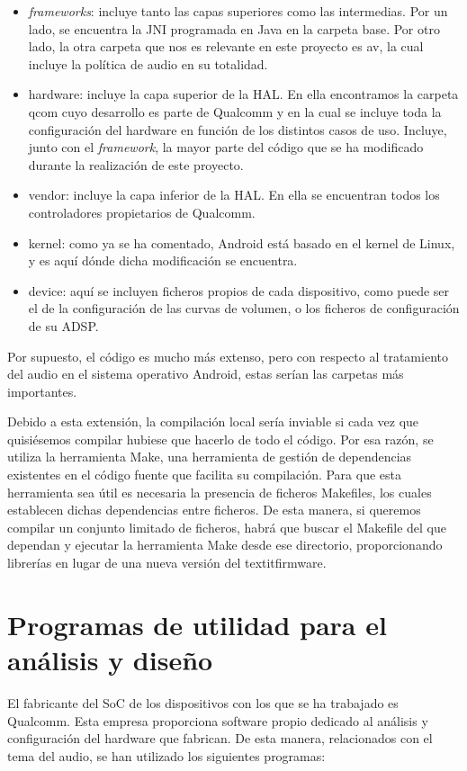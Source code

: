 \begin{itemize}
	\item{\textit{frameworks}: incluye tanto las capas superiores como las intermedias. Por un lado, se encuentra la \gls{JNI} programada en Java en la carpeta base. Por otro lado, la otra carpeta que nos es relevante en este proyecto es av, la cual incluye la política de audio en su totalidad.}
	\item{hardware: incluye la capa superior de la \gls{HAL}. En ella encontramos la carpeta qcom cuyo desarrollo es parte de Qualcomm y en la cual se incluye toda la configuración del hardware en función de los distintos casos de uso. Incluye, junto con el \textit{framework}, la mayor parte del código que se ha modificado durante la realización de este proyecto.}
	\item{vendor: incluye la capa inferior de la \gls{HAL}. En ella se encuentran todos los controladores propietarios de Qualcomm.}
	\item{kernel: como ya se ha comentado, Android está basado en el kernel de Linux, y es aquí dónde dicha modificación se encuentra.}
	\item{device: aquí se incluyen ficheros propios de cada dispositivo, como puede ser el de la configuración de las curvas de volumen, o los ficheros de configuración de su \gls{ADSP}.}	
\end{itemize}

Por supuesto, el código es mucho más extenso, pero con respecto al tratamiento del audio en el sistema operativo Android, estas serían las carpetas más importantes.

Debido a esta extensión, la compilación local sería inviable si cada vez que quisiésemos compilar hubiese que hacerlo de todo el código. Por esa razón, se utiliza la herramienta Make, una herramienta de gestión de dependencias existentes en el código fuente que facilita su compilación. Para que esta herramienta sea útil es necesaria la presencia de ficheros Makefiles, los cuales establecen dichas dependencias entre ficheros. De esta manera, si queremos compilar un conjunto limitado de ficheros, habrá que buscar el Makefile del que dependan y ejecutar la herramienta Make desde ese directorio, proporcionando librerías en lugar de una nueva versión del textit{firmware}.


\section{Programas de utilidad para el análisis y diseño}
El fabricante del \gls{SoC} de los dispositivos con los que se ha trabajado es Qualcomm. Esta empresa proporciona software propio dedicado al análisis y configuración del hardware que fabrican. De esta manera, relacionados con el tema del audio, se han utilizado los siguientes programas:

